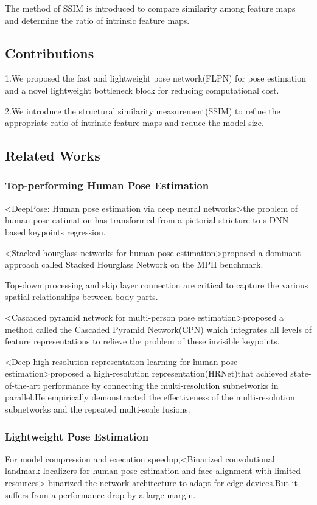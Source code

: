 \documentclass[11pt]{article}
\begin{document}
The method of SSIM is introduced to compare similarity among feature maps and determine the ratio of intrinsic feature maps.

\subsection{Contributions}
1.We proposed the fast and lightweight pose network(FLPN) for pose estimation and a novel lightweight bottleneck block for reducing computational cost.

2.We introduce the structural similarity measurement(SSIM) to refine the appropriate ratio of intrinsic feature maps and reduce the model size.

\subsection{Related Works}
\subsubsection{Top-performing Human Pose Estimation}
<DeepPose: Human pose estimation via deep neural networks>the problem of human pose eatimation has transformed from a pictorial stricture to s DNN-based keypoints regression.

<Stacked hourglass networks for human pose estimation>proposed a dominant approach called Stacked Hourglass Network on the MPII benchmark.

Top-down processing and skip layer connection are critical to capture the various spatial relationships between body parts.

<Cascaded pyramid network for multi-person pose estimation>proposed a method called the Cascaded Pyramid Network(CPN) which integrates all  levels of feature representations to relieve the problem of these invisible keypoints.

<Deep high-resolution representation learning for human pose estimation>proposed a high-resolution representation(HRNet)that achieved state-of-the-art performance by connecting the multi-resolution subnetworks in parallel.He empirically demonstracted the effectiveness of the multi-resolution subnetworks and the repeated multi-scale fusions.

\subsubsection{Lightweight Pose Estimation}
For model compression and execution speedup,<Binarized convolutional landmark localizers for human pose estimation and face alignment with limited resources> binarized the network architecture to adapt for edge devices.But it suffers from a performance drop by a large margin.
\end{document}
